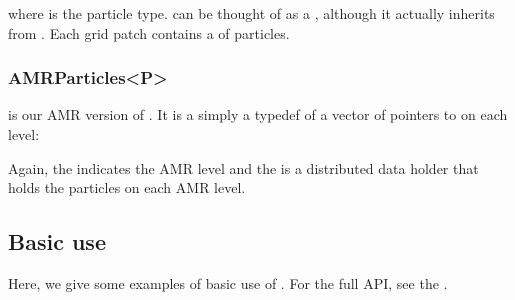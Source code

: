 \documentclass[letterpaper,10pt,english]{sphinxmanual}
\begin{document}
\begin{sphinxVerbatim}[commandchars=\\\{\},formatcom=\scriptsize]
  
\end{sphinxVerbatim}

where  is the particle type.
 can be thought of as a , although it actually inherits from .
Each grid patch contains a  of particles.


\subsubsection{AMRParticles\textless{}P\textgreater{}}
\label{\detokenize{Source/Particles:amrparticles-p}}
 is our AMR version of .
It is a simply a typedef of a vector of pointers to  on each level:

\begin{sphinxVerbatim}[commandchars=\\\{\},formatcom=\scriptsize]
  
     
\end{sphinxVerbatim}

Again, the  indicates the AMR level and the  is a distributed data holder that holds the particles on each AMR level.


\subsection{Basic use}
\label{\detokenize{Source/Particles:basic-use}}
Here, we give some examples of basic use of .
For the full API, see the .
\end{document}
